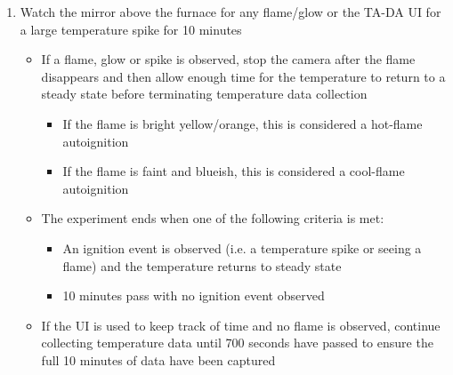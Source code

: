 \documentclass[letterpaper,11pt]{article}
\begin{document}
\begin{enumerate}
    \item Watch the mirror above the furnace for any flame/glow or the TA-DA UI
        for a large temperature spike for 10 minutes
        \begin{itemize}
        \item If a flame, glow or spike is observed, stop the camera after the 
            flame disappears and then allow enough time for the temperature to 
            return to a steady state before terminating temperature data 
            collection
                \begin{itemize}
                \item If the flame is bright yellow/orange, this is considered a 
                    hot-flame autoignition
                \item If the flame is faint and blueish, this is considered a 
                    cool-flame autoignition
                \end{itemize}
        
        \item The experiment ends when one of the following criteria is met:
            \begin{itemize} 
            \item An ignition event is observed (i.e. a temperature spike or 
                seeing a flame) and the temperature returns to steady state
            \item 10 minutes pass with no ignition event observed
            \end{itemize}
        \item If the UI is used to keep track of time and no flame is observed, 
            continue collecting temperature data until 700 seconds have passed 
            to ensure the full 10 minutes of data have been captured
        \end{itemize}
    

\end{enumerate}
\end{document}
